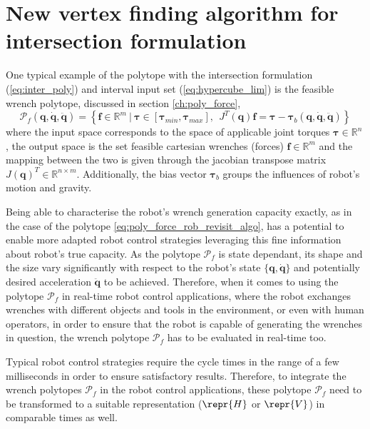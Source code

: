 \section{New vertex finding algorithm for intersection formulation}
\label{sec:algorithm_vea}

One typical example of the polytope with the intersection formulation (\ref{eq:inter_poly}) and interval input set (\ref{eq:hypercube_lim}) is the feasible wrench polytope, discussed in section \ref{ch:poly_force},
\begin{equation}
    \mathcal{P}_f(\bm{q},\dot{\bm{q}},\ddot{\bm{q}}) = \left\{ \bm{f} \in \mathbb{R}^m ~|~ \bm{\tau}\in\left[\bm{\tau}_{min}, \bm{\tau}_{max} \right], ~~ J^T(\bm{q})\bm{f} = \bm{\tau} -\bm{\tau}_b(\bm{q},\dot{\bm{q}},\ddot{\bm{q}}) \right\}
    \label{eq:poly_force_rob_revisit_algo}
\end{equation}
where the input space corresponds to the space of applicable joint torques $\bm{\tau}\in\mathbb{R}^n$, the output space is the set feasible cartesian wrenches (forces) $\bm{f}\in\mathbb{R}^m$ and the mapping between the two is given through the jacobian transpose matrix $J(\bm{q})^T\in\mathbb{R}^{n\times m}$. Additionally, the bias vector $\bm{\tau}_b$ groups the influences of robot's motion and gravity.

Being able to characterise the robot's wrench generation capacity exactly, as in the case of the polytope \ref{eq:poly_force_rob_revisit_algo}, has a potential to enable more adapted robot control strategies leveraging this fine information about robot's true capacity.  As the polytope $\mathcal{P}_f$ is state dependant, its shape and the size vary significantly with respect to the robot's state $\{\bm{q},\dot{\bm{q}}\}$ and potentially desired acceleration $\ddot{\bm{q}}$ to be achieved. Therefore, when it comes to using the polytope $\mathcal{P}_f$ in real-time robot control applications, where the robot exchanges wrenches with different objects and tools in the environment, or even with human operators, in order to ensure that the robot is capable of generating the wrenches in question, the wrench polytope $\mathcal{P}_f$ has to be evaluated in real-time too. 

Typical robot control strategies require the cycle times in the range of a few milliseconds in order to ensure satisfactory results. Therefore, to integrate the wrench polytopes $\mathcal{P}_f$ in the robot control applications, these polytope $\mathcal{P}_f$ need to be transformed to a suitable representation ($\repr{H}$ or $\repr{V}$) in comparable times as well.


